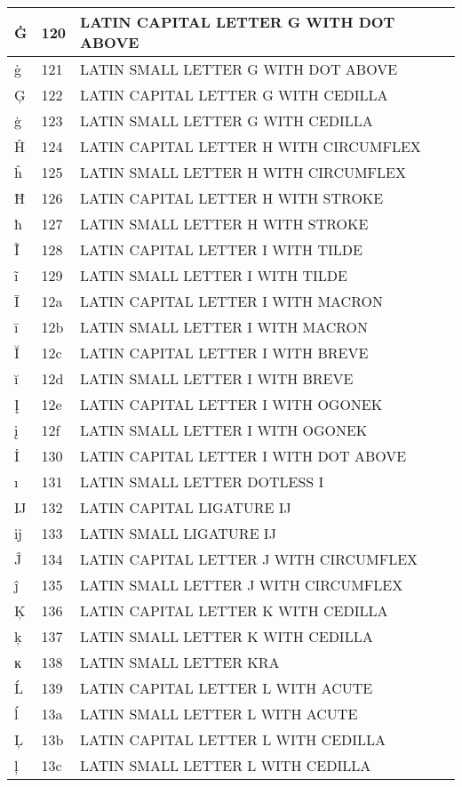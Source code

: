 \documentclass[12pt,letterpaper,openany]{book}
\begin{document}
\begin{center}
\begin{supertabular}{|m{0.25in}|m{0.5in}|m{4in}|}
Ġ & 120 & LATIN CAPITAL LETTER G WITH DOT ABOVE\\\hline
ġ & 121 & LATIN SMALL LETTER G WITH DOT ABOVE\\\hline
Ģ & 122 & LATIN CAPITAL LETTER G WITH CEDILLA\\\hline
ģ & 123 & LATIN SMALL LETTER G WITH CEDILLA\\\hline
Ĥ & 124 & LATIN CAPITAL LETTER H WITH CIRCUMFLEX\\\hline
ĥ & 125 & LATIN SMALL LETTER H WITH CIRCUMFLEX\\\hline
Ħ & 126 & LATIN CAPITAL LETTER H WITH STROKE\\\hline
ħ & 127 & LATIN SMALL LETTER H WITH STROKE\\\hline
Ĩ & 128 & LATIN CAPITAL LETTER I WITH TILDE\\\hline
ĩ & 129 & LATIN SMALL LETTER I WITH TILDE\\\hline
Ī & 12a & LATIN CAPITAL LETTER I WITH MACRON\\\hline
ī & 12b & LATIN SMALL LETTER I WITH MACRON\\\hline
Ĭ & 12c & LATIN CAPITAL LETTER I WITH BREVE\\\hline
ĭ & 12d & LATIN SMALL LETTER I WITH BREVE\\\hline
Į & 12e & LATIN CAPITAL LETTER I WITH OGONEK\\\hline
į & 12f & LATIN SMALL LETTER I WITH OGONEK\\\hline
İ & 130 & LATIN CAPITAL LETTER I WITH DOT ABOVE\\\hline
ı & 131 & LATIN SMALL LETTER DOTLESS I\\\hline
Ĳ & 132 & LATIN CAPITAL LIGATURE IJ\\\hline
ĳ & 133 & LATIN SMALL LIGATURE IJ\\\hline
Ĵ & 134 & LATIN CAPITAL LETTER J WITH CIRCUMFLEX\\\hline
ĵ & 135 & LATIN SMALL LETTER J WITH CIRCUMFLEX\\\hline
Ķ & 136 & LATIN CAPITAL LETTER K WITH CEDILLA\\\hline
ķ & 137 & LATIN SMALL LETTER K WITH CEDILLA\\\hline
ĸ & 138 & LATIN SMALL LETTER KRA\\\hline
Ĺ & 139 & LATIN CAPITAL LETTER L WITH ACUTE\\\hline
ĺ & 13a & LATIN SMALL LETTER L WITH ACUTE\\\hline
Ļ & 13b & LATIN CAPITAL LETTER L WITH CEDILLA\\\hline
ļ & 13c & LATIN SMALL LETTER L WITH CEDILLA\\\hline

\end{supertabular}
\end{center}
\end{document}
